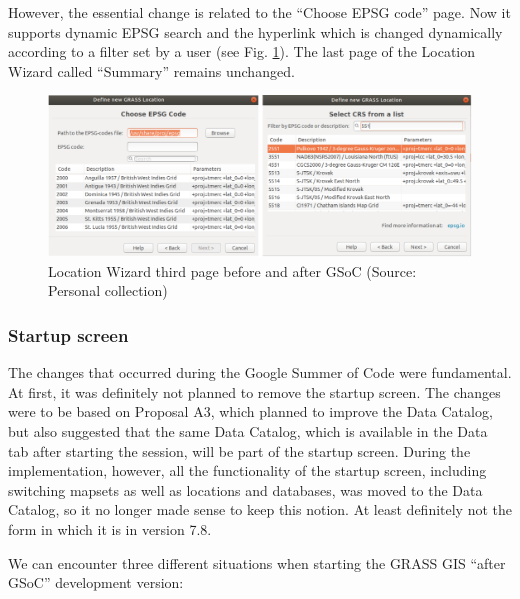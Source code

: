 \documentclass[a4paper,10pt,twoside]{article}
\begin{document}
\newpage
However, the essential change is related to the ``Choose EPSG code'' page. Now it supports dynamic EPSG search and the hyperlink which is changed dynamically according to a filter set by a user (see Fig. \ref{fig:loc_wiz_3}). The last page of the Location Wizard called ``Summary'' remains unchanged.


\vspace{0.3cm}
\begin{figure}[hbt!] 
\begin{center}
\includegraphics[width=17cm]{../pictures/loc_wiz_3.png} 
\caption[Location Wizard third page before and after GSoC)]{Location Wizard third page before and after GSoC (Source: Personal collection)}
\label{fig:loc_wiz_3}
\end{center}
\end{figure}

\vspace*{-1cm}
\subsubsection{Startup screen}

The changes that occurred during the Google Summer of Code were fundamental. At first, it was definitely not planned to remove the startup screen. The changes were to be based on Proposal A3, which planned to improve the Data Catalog, but also suggested that the same Data Catalog, which is available in the Data tab after starting the session, will be part of the startup screen.
During the implementation, however, all the functionality of the startup screen, including switching mapsets as well as locations and databases, was moved to the Data Catalog, so it no longer made sense to keep this notion. At least definitely not the form in which it is in version 7.8.

\noindent We can encounter three different situations when starting the GRASS GIS ``after GSoC'' development version:
\end{document}
